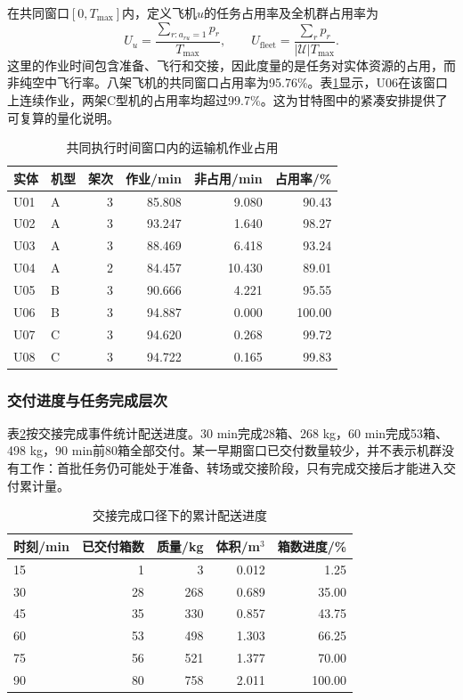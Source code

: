 \documentclass[withoutpreface,colorprint]{format}
\numberwithin{equation}{section}
\numberwithin{figure}{section}
\numberwithin{table}{section}
\begin{document}
在共同窗口$[0,T_{\max}]$内，定义飞机$u$的任务占用率及全机群占用率为
\begin{equation}
 U_u=\frac{\sum_{r:a_{ru}=1}p_r}{T_{\max}},\qquad
 U_{\mathrm{fleet}}=\frac{\sum_rp_r}{|\mathcal U|T_{\max}}.
 \label{eq:q2_occupation}
\end{equation}
这里的作业时间包含准备、飞行和交接，因此度量的是任务对实体资源的占用，而非纯空中飞行率。八架飞机的共同窗口占用率为95.76\%。表\ref{tab:rev_q2_util}显示，U06在该窗口上连续作业，两架C型机的占用率均超过99.7\%。这为甘特图中的紧凑安排提供了可复算的量化说明。

\begin{table}[htbp]\centering\small
\caption{共同执行时间窗口内的运输机作业占用}\label{tab:rev_q2_util}
\begin{tabular}{llrrrr}\toprule
实体 & 机型 & 架次 & 作业/min & 非占用/min & 占用率/\%\\\midrule
U01 & A & 3 & 85.808 & 9.080 & 90.43\\
U02 & A & 3 & 93.247 & 1.640 & 98.27\\
U03 & A & 3 & 88.469 & 6.418 & 93.24\\
U04 & A & 2 & 84.457 & 10.430 & 89.01\\
U05 & B & 3 & 90.666 & 4.221 & 95.55\\
U06 & B & 3 & 94.887 & 0.000 & 100.00\\
U07 & C & 3 & 94.620 & 0.268 & 99.72\\
U08 & C & 3 & 94.722 & 0.165 & 99.83\\
\bottomrule\end{tabular}
\end{table}


\subsubsection{交付进度与任务完成层次}
表\ref{tab:rev_q2_milestones}按交接完成事件统计配送进度。30 min完成28箱、268 kg，60 min完成53箱、498 kg，90 min前80箱全部交付。某一早期窗口已交付数量较少，并不表示机群没有工作：首批任务仍可能处于准备、转场或交接阶段，只有完成交接后才能进入交付累计量。

\begin{table}[htbp]\centering\small
\caption{交接完成口径下的累计配送进度}\label{tab:rev_q2_milestones}
\begin{tabular}{lrrrr}\toprule
时刻/min & 已交付箱数 & 质量/kg & 体积/m$^3$ & 箱数进度/\%\\\midrule
15 & 1 & 3 & 0.012 & 1.25\\
30 & 28 & 268 & 0.689 & 35.00\\
45 & 35 & 330 & 0.857 & 43.75\\
60 & 53 & 498 & 1.303 & 66.25\\
75 & 56 & 521 & 1.377 & 70.00\\
90 & 80 & 758 & 2.011 & 100.00\\
\bottomrule\end{tabular}
\end{table}
\end{document}
